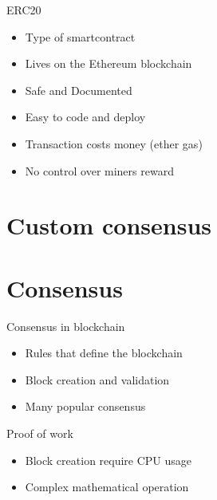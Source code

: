 \documentclass[12pt]{beamer}
\begin{document}
  \begin{frame}{ERC20}
    \begin{itemize}
      \item Type of \alert{smartcontract}
      \item Lives on the \alert{Ethereum} blockchain
    \end{itemize}
    \begin{itemize}
      \item Safe and Documented
      \item Easy to code and deploy
    \end{itemize}
    \begin{itemize}
      \item Transaction costs money (ether gas)
      \item No control over miners reward
    \end{itemize}
  \end{frame}



  \section{Custom consensus}


  \section{Consensus}

  \begin{frame}{Consensus in blockchain}
    \begin{itemize}
      \item Rules that define the blockchain
      \item Block creation and validation
      \item Many popular consensus
    \end{itemize}
  \end{frame}

  \begin{frame}{Proof of work}
    \begin{itemize}
      \item Block creation require CPU usage
      \item Complex mathematical operation
    \end{itemize}
  \end{frame}
\end{document}
